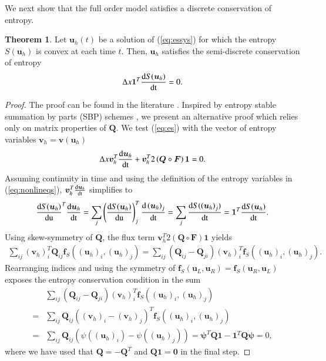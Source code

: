\documentclass[preprint,10pt]{elsarticle}
\theoremstyle{definition}
\theoremstyle{lemma}
\theoremstyle{theorem}
\newtheorem{theorem}{Theorem}
\theoremstyle{assumption}
\newcommand{\td}[2]{\frac{{\rm d}#1}{{\rm d}{\rm #2}}}
\newcommand{\LRp}[1]{\left( #1 \right)}
\begin{document}
We next show that the full order model satisfies a discrete conservation of entropy.  
\begin{theorem}
\label{thm:ecfom}
Let $\bm{u}_h(t)$ be a solution of (\ref{eq:essys}) for which the entropy $S(\bm{u}_h)$ is convex at each time $t$.  Then, $\bm{u}_h$ satisfies the semi-discrete conservation of entropy 
\[
\Delta x \bm{1}^T\td{S(\bm{u}_h)}{t} = 0.
\]
\end{theorem}
\begin{proof}
The proof can be found in the literature \cite{tadmor1987numerical, tadmor2003entropy, tadmor2016entropy}.  Inspired by entropy stable summation by parts (SBP) schemes \cite{carpenter2014entropy, gassner2016split, chen2017entropy, crean2018entropy, chan2017discretely}, we present an alternative proof which relies only on matrix properties of $\bm{Q}$.  We test (\ref{eq:es}) with the vector of entropy variables $\bm{v}_h = \bm{v}(\bm{u}_h)$
\[
\Delta x \bm{v}_h^T\td{\bm{u}_h}{t} + \bm{v}_h^T2\LRp{{\bm{Q}}\circ \bm{F}}\bm{1} = 0.
\]
Assuming continuity in time and using the definition of the entropy variables in (\ref{eq:nonlineqs}), $\bm{v}_h^T\td{\bm{u}_h}{t}$ simplifies to
\begin{align*}
{\td{S(\bm{u}_h)}{\bm{u}}}^T\td{\bm{u}_h}{t} = \sum_j \LRp{\td{S(\bm{u}_h)}{\bm{u}}}_j^T\td{\LRp{\bm{u}_h}_j}{t} =  \sum_j \td{S(\LRp{\bm{u}_h}_j)}{t}  =  \bm{1}^T\td{S(\bm{u}_h)}{t}.
\end{align*}
Using skew-symmetry of $\bm{Q}$, the flux term $\bm{v}_h^T2\LRp{{\bm{Q}}\circ \bm{F}}\bm{1}$ yields
\begin{align*}
\sum_{ij} \LRp{\bm{v}_h}_i^T \bm{Q}_{ij} \bm{f}_{S}\LRp{\LRp{\bm{u}_h}_i, \LRp{\bm{u}_h}_j} = \sum_{ij} \LRp{\bm{Q}_{ij}-\bm{Q}_{ji}} \LRp{\bm{v}_h}_i^T  \bm{f}_{S}\LRp{\LRp{\bm{u}_h}_i, \LRp{\bm{u}_h}_j}.
\end{align*}
Rearranging indices and using the symmetry of $\bm{f}_S(\bm{u}_L,\bm{u}_R) = \bm{f}_S(\bm{u}_R,\bm{u}_L)$ exposes the entropy conservation condition in the sum
\begin{align*}
&\sum_{ij} \LRp{\bm{Q}_{ij}-\bm{Q}_{ji}} \LRp{\bm{v}_h}_i^T \bm{f}_{S}\LRp{\LRp{\bm{u}_h}_i, \LRp{\bm{u}_h}_j} \\
=&\sum_{ij} \bm{Q}_{ij} \LRp{\LRp{\bm{v}_h}_i-\LRp{\bm{v}_h}_j}^T  \bm{f}_{S}\LRp{\LRp{\bm{u}_h}_i, \LRp{\bm{u}_h}_j}\\
=&\sum_{ij} \bm{Q}_{ij} \LRp{\psi\LRp{\LRp{\bm{u}_h}_i} - \psi(\LRp{\bm{u}_h}_j)} = \bm{\psi}^T\bm{Q}\bm{1}-\bm{1}^T\bm{Q}\bm{\psi} = 0,
\end{align*}
where we have used that $\bm{Q}=-\bm{Q}^T$ and $\bm{Q}\bm{1} = \bm{0}$ in the final step.

\end{proof}
\end{document}
